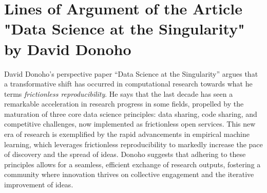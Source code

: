 \documentclass[]{hdsr}
\begin{document}
\section{Lines of Argument of the Article "Data Science at the Singularity" by David Donoho}
\label{intro}
David Donoho's perspective paper ``Data Science at the Singularity'' argues that a transformative shift has occurred in computational research towards what he terms \emph{frictionless reproducibility}. He says that the last decade has seen a remarkable acceleration in research progress in some fields, propelled by the maturation of three core data science principles: data sharing, code sharing, and competitive challenges, now implemented as frictionless open services. This new era of research is exemplified by the rapid advancements in empirical machine learning, which leverages frictionless reproducibility to markedly increase the pace of discovery and the spread of ideas. Donoho suggests that adhering to these principles allows for a seamless, efficient exchange of research outputs, fostering a community where innovation thrives on collective engagement and the iterative improvement of ideas.
\end{document}
